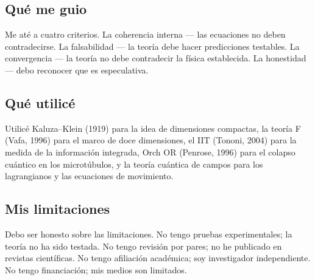 \subsection{Qué me guio}
Me até a cuatro criterios. La coherencia interna --- las ecuaciones no deben contradecirse. La falsabilidad --- la teoría debe hacer predicciones testables. La convergencia --- la teoría no debe contradecir la física establecida. La honestidad --- debo reconocer que es especulativa.

\subsection{Qué utilicé}
Utilicé Kaluza--Klein (1919) para la idea de dimensiones compactas, la teoría F (Vafa, 1996) para el marco de doce dimensiones, el IIT (Tononi, 2004) para la medida de la información integrada, Orch OR (Penrose, 1996) para el colapso cuántico en los microtúbulos, y la teoría cuántica de campos para los lagrangianos y las ecuaciones de movimiento.

\subsection{Mis limitaciones}
Debo ser honesto sobre las limitaciones. No tengo pruebas experimentales; la teoría no ha sido testada. No tengo revisión por pares; no he publicado en revistas científicas. No tengo afiliación académica; soy investigador independiente. No tengo financiación; mis medios son limitados.
